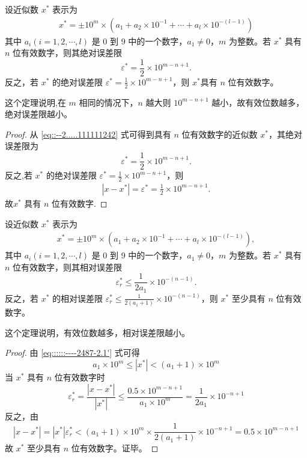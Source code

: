 \documentclass[../../main.tex]{subfiles}
\begin{document}
\begin{theorem}
设近似数 $x^*$ 表示为 
\begin{align}
x^* = \pm 10^m \times (a_1 + a_2 \times 10^{-1} + \cdots + a_l \times 10^{-(l - 1)}) \label{eq::::::----2487-2.1'}
\end{align}
其中 $a_i (i = 1, 2, \cdots, l)$ 是 0 到 9 中的一个数字，$a_1 \neq 0$，$m$ 为整数。若 $x^*$ 具有 $n$ 位有效数字，则其绝对误差限
\[
\varepsilon^* = \frac{1}{2} \times 10^{m - n + 1}.
\]
反之，若 $x^*$ 的绝对误差限 $\varepsilon^* = \frac{1}{2} \times 10^{m - n + 1}$，则 $x^*$具有 $n$ 位有效数字。
\end{theorem}
\begin{note}
这个定理说明,在 $m$ 相同的情况下，$n$ 越大则 $10^{m - n + 1}$ 越小，故有效位数越多，绝对误差限越小。
\end{note}
\begin{proof}
从 \eqref{eq::--2.....111111242} 式可得到具有 $n$ 位有效数字的近似数 $x^*$，其绝对误差限为 
\[
\varepsilon^* = \frac{1}{2} \times 10^{m - n + 1}.
\]
反之,若 $x^*$ 的绝对误差限 $\varepsilon^* = \frac{1}{2} \times 10^{m - n + 1}$，则
\begin{align*}
|x-x^*|=\varepsilon^*=\frac{1}{2} \times 10^{m - n + 1}.
\end{align*}
故$x^*$ 具有 $n$ 位有效数字.
\end{proof}

\begin{theorem}
设近似数 $x^*$ 表示为
\begin{align*}
x^* = \pm 10^m \times (a_1 + a_2 \times 10^{-1} + \cdots + a_l \times 10^{-(l - 1)}), 
\end{align*}
其中 $a_i (i = 1, 2, \cdots, l)$ 是 0 到 9 中的一个数字，$a_1 \neq 0$，$m$ 为整数。若 $x^*$ 具有 $n$ 位有效数字，则其相对误差限 
\[
\varepsilon_r^* \leqslant \frac{1}{2a_1} \times 10^{-(n - 1)}.
\]
反之，若 $x^*$ 的相对误差限 $\varepsilon_r^* \leqslant \frac{1}{2(a_1 + 1)} \times 10^{-(n - 1)}$，则 $x^*$ 至少具有 $n$ 位有效数字。
\end{theorem}
\begin{note}
这个定理说明，有效位数越多，相对误差限越小。
\end{note}
\begin{proof}
由 \eqref{eq::::::----2487-2.1'} 式可得 
\[
a_1 \times 10^m \leqslant | x^* | < (a_1 + 1) \times 10^m
\]
当 $x^*$ 具有 $n$ 位有效数字时 
\[
\varepsilon_r^* = \frac{| x - x^* |}{| x^* |} \leqslant \frac{0.5 \times 10^{m - n + 1}}{a_1 \times 10^m} = \frac{1}{2a_1} \times 10^{-n + 1}
\]
反之，由 
\[
| x - x^* | = | x^* | \varepsilon_r^* < (a_1 + 1) \times 10^m \times \frac{1}{2(a_1 + 1)} \times 10^{-n + 1} = 0.5 \times 10^{m - n + 1}
\]
故 $x^*$ 至少具有 $n$ 位有效数字。证毕。
\end{proof}
\end{document}
